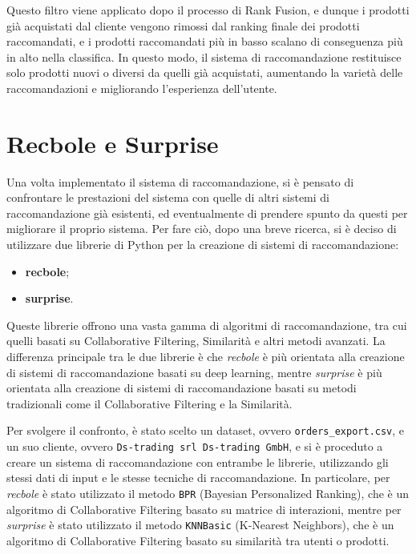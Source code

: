 Questo filtro viene applicato dopo il processo di Rank Fusion, e dunque i prodotti già acquistati dal cliente vengono rimossi dal ranking finale dei prodotti raccomandati, e i prodotti raccomandati più in basso scalano di conseguenza più in alto nella classifica. In questo modo, il sistema di raccomandazione restituisce solo prodotti nuovi o diversi da quelli già acquistati, aumentando la varietà delle raccomandazioni e migliorando l'esperienza dell'utente.


\section{Recbole e Surprise}

Una volta implementato il sistema di raccomandazione, si è pensato di confrontare le prestazioni del sistema con quelle di altri sistemi di raccomandazione già esistenti, ed eventualmente di prendere spunto da questi per migliorare il proprio sistema.
Per fare ciò, dopo una breve ricerca, si è deciso di utilizzare due librerie di Python per la creazione di sistemi di raccomandazione:
\begin{itemize}
    \item \textbf{\gls{recbole}};
    \item \textbf{\gls{surprise}}.
\end{itemize}

Queste librerie offrono una vasta gamma di algoritmi di raccomandazione, tra cui quelli basati su Collaborative Filtering, Similarità e altri metodi avanzati. La differenza principale tra le due librerie è che \emph{recbole} è più orientata alla creazione di sistemi di raccomandazione basati su deep learning, mentre \emph{surprise} è più orientata alla creazione di sistemi di raccomandazione basati su metodi tradizionali come il Collaborative Filtering e la Similarità.

Per svolgere il confronto, è stato scelto un dataset, ovvero \texttt{orders_export.csv}, e un suo cliente, ovvero \texttt{Ds-trading srl Ds-trading GmbH}, e si è proceduto a creare un sistema di raccomandazione con entrambe le librerie, utilizzando gli stessi dati di input e le stesse tecniche di raccomandazione. In particolare, per \emph{recbole} è stato utilizzato il metodo \texttt{BPR} (Bayesian Personalized Ranking), che è un algoritmo di Collaborative Filtering basato su matrice di interazioni, mentre per \emph{surprise} è stato utilizzato il metodo \texttt{KNNBasic} (K-Nearest Neighbors), che è un algoritmo di Collaborative Filtering basato su similarità tra utenti o prodotti.

